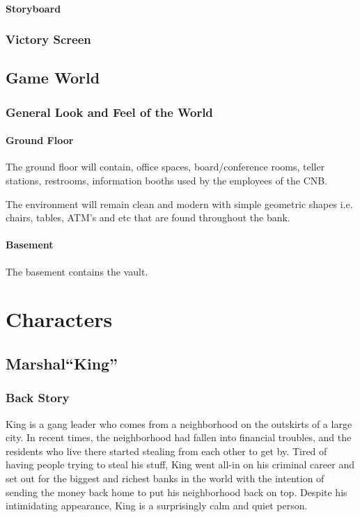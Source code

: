 \documentclass[14pt]{report}
\begin{document}
\subsubsection{Storyboard}

\subsection{Victory Screen}

\section{Game World}

\subsection{General Look and Feel of the World}

\subsubsection{Ground Floor}

The ground floor will contain, office spaces, board/conference rooms, teller stations, restrooms, information booths used by the employees of the CNB.

The environment will remain clean and modern with simple geometric shapes i.e. chairs, tables, ATM’s and etc that are found throughout the bank.

\subsubsection{Basement}
The basement contains the vault.

\chapter{Characters}

\section{Marshal``King''}

\subsection{Back Story}

King is a gang leader who comes from a neighborhood on the outskirts of a large city. In recent times, the neighborhood had fallen into financial troubles, and the residents who live there started stealing from each other to get by. Tired of having people trying to steal his stuff, King went all-in on his criminal career and set out for the biggest and richest banks in the world with the intention of sending the money back home to put his neighborhood back on top. Despite his intimidating appearance, King is a surprisingly calm and quiet person.
\end{document}
